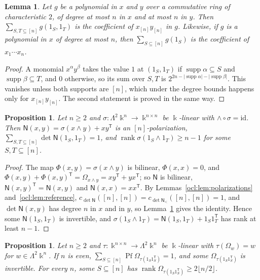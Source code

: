 \documentclass[11pt]{amsart}
\newtheorem{lemma}[theorem]{Lemma}
\newtheorem{proposition}[theorem]{Proposition}
\theoremstyle{definition}
\theoremstyle{remark}
\numberwithin{equation}{section}
\newcommand{\id}{\mathrm{id}}
\newcommand{\abs}[1]{\lvert #1\rvert}
\newcommand{\rank}{\operatorname{rank}}
\theoremstyle{plain}
\theoremstyle{definition}
\theoremstyle{plain}
\begin{document}
\begin{lemma}\label{ocl:lem:parity}
Let $g$ be a polynomial in $x$ and $y$ over a commutative ring of characteristic $2$, of degree at most $n$ in $x$ and
at most $n$ in $y$. Then $\sum_{S,T\subseteq[n]}g(1_S,1_T)$ is the coefficient of $x_{[n]}y_{[n]}$ in $g$. Likewise, if
$g$ is a polynomial in $x$ of degree at most $n$, then $\sum_{S\subseteq[n]}g(1_S)$ is the coefficient of $x_1\cdots
x_n$.
\end{lemma}

\begin{proof}
A monomial $x^\alpha y^\beta$ takes the value $1$ at $(1_S,1_T)$ if $\operatorname{supp}\alpha\subseteq S$ and
$\operatorname{supp}\beta\subseteq T$, and $0$ otherwise, so its sum over $S,T$ is
$2^{2n-\abs{\operatorname{supp}\alpha}-\abs{\operatorname{supp}\beta}}$. This vanishes unless both supports are $[n]$,
which under the degree bounds happens only for $x_{[n]}y_{[n]}$. The second statement is proved in the same way.
\end{proof}

\begin{proposition}\label{ocl:prop:sections}
Let $n\ge2$ and $\sigma\colon\Lambda^2\Bbbk^n\to\Bbbk^{n\times n}$ be $\Bbbk$-linear with $\wedge\circ\sigma=\id$. Then
$\mathsf N(x,y)=\sigma(x\wedge y)+xy^{\mathsf T}$ is an $[n]$-polarization, $\sum_{S,T\subseteq[n]}\det\mathsf
N(1_S,1_T)=1$, and $\rank\sigma(1_S\wedge1_T)\ge n-1$ for some $S,T\subseteq[n]$.
\end{proposition}

\begin{proof}
The map $\Phi(x,y)=\sigma(x\wedge y)$ is bilinear, $\Phi(x,x)=0$, and $\Phi(x,y)+\Phi(x,y)^{\mathsf T}=\Omega_{x\wedge
y}=xy^{\mathsf T}+yx^{\mathsf T}$; so $\mathsf N$ is bilinear, $\mathsf N(x,y)^{\mathsf T}=\mathsf N(x,y)$ and
$\mathsf N(x,x)=xx^{\mathsf T}$. By Lemmas~\ref{ocl:lem:polarizations}
and~\ref{ocl:lem:reference}, $c_{\det\mathsf N}([n],[n])=c_{\det\mathsf N_<}([n],[n])=1$, and $\det\mathsf N(x,y)$ has
degree $n$ in $x$ and in $y$, so Lemma~\ref{ocl:lem:parity} gives the identity. Hence some $\mathsf N(1_S,1_T)$ is
invertible, and $\sigma(1_S\wedge1_T)=\mathsf N(1_S,1_T)+1_S1_T^{\mathsf T}$ has rank at least $n-1$.
\end{proof}

\begin{proposition}\label{ocl:prop:retractions}
Let $n\ge2$ and $\tau\colon\Bbbk^{n\times n}\to\Lambda^2\Bbbk^n$ be $\Bbbk$-linear with $\tau(\Omega_w)=w$ for
$w\in\Lambda^2\Bbbk^n$. If $n$ is even, $\sum_{S\subseteq[n]}\operatorname{Pf}\Omega_{\tau(1_S1_S^{\mathsf T})}=1$, and
some $\Omega_{\tau(1_S1_S^{\mathsf T})}$ is invertible. For every $n$, some $S\subseteq[n]$ has
$\rank\Omega_{\tau(1_S1_S^{\mathsf T})}\ge2\lfloor n/2\rfloor$.
\end{proposition}
\end{document}
